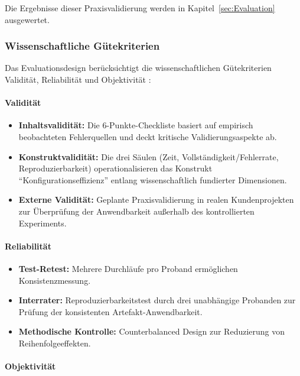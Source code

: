 Die Ergebnisse dieser Praxisvalidierung werden in Kapitel~\ref{sec:Evaluation} ausgewertet.

\subsubsection{Wissenschaftliche Gütekriterien}
\label{subsubsec:Guetekriterien}

Das Evaluationsdesign berücksichtigt die wissenschaftlichen Gütekriterien Validität, Reliabilität und Objektivität \citep{gothesis:methodikteil}:

\paragraph{Validität}

\begin{itemize}
    \item \textbf{Inhaltsvalidität:} Die 6-Punkte-Checkliste basiert auf empirisch beobachteten Fehlerquellen und deckt kritische Validierungsaspekte ab.
    \item \textbf{Konstruktvalidität:} Die drei Säulen (Zeit, Vollständigkeit/Fehlerrate, Reproduzierbarkeit) operationalisieren das Konstrukt ``Konfigurationseffizienz'' entlang wissenschaftlich fundierter Dimensionen.
    \item \textbf{Externe Validität:} Geplante Praxisvalidierung in realen Kundenprojekten zur Überprüfung der Anwendbarkeit außerhalb des kontrollierten Experiments.
\end{itemize}

\paragraph{Reliabilität}

\begin{itemize}
    \item \textbf{Test-Retest:} Mehrere Durchläufe pro Proband ermöglichen Konsistenzmessung.
    \item \textbf{Interrater:} Reproduzierbarkeitstest durch drei unabhängige Probanden zur Prüfung der konsistenten Artefakt-Anwendbarkeit.
    \item \textbf{Methodische Kontrolle:} Counterbalanced Design zur Reduzierung von Reihenfolgeeffekten.
\end{itemize}

\paragraph{Objektivität}

